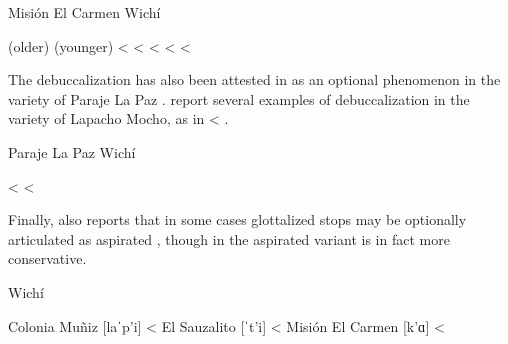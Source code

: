 \ea
Misión El Carmen Wichí \citep{MC09} \label{mec-deb}\\
    \begin{xlist}
        \ex {} (older) \recind {} (younger) <  \label{mec-kyekye}
        \ex {} < 
        \ex {} < 
        \ex {} <  \label{mec-toaj}
        \ex {} < \label{mec-mudi}
    \end{xlist}
\z
{}

The debuccalization has also been attested in \citet{AFG067} as an optional phenomenon in the variety of Paraje La Paz . \citet[167–168]{AFG-SS-09} report several examples of debuccalization in the variety of Lapacho Mocho, as in  < .

\ea
Paraje La Paz Wichí \citep{AFG067} \label{plp-deb}\\
    \begin{xlist}
        \ex {} \recind {} \recind {} < 
        \ex {} \recind {} \recind {} < 
    \end{xlist}
\z

Finally, \citet[125]{MC09} also reports that in some cases glottalized stops may be optionally articulated as aspirated , though in  the aspirated variant is in fact more conservative.

\ea
Wichí \citep[125]{MC09} \label{wi-glotasp}\\
    \begin{xlist}
        \ex Colonia Muñiz [laˈp’i] \recind [laˈpʰi] < 
        \ex El Sauzalito [ˈt’i] \recind [ˈtʰi] < 
        \ex Misión El Carmen [k’ɑ] \recind [ˈkʰɑ] \recind [ˈqʰa] <  \label{mec-qha}
    \end{xlist}
\z
{}

